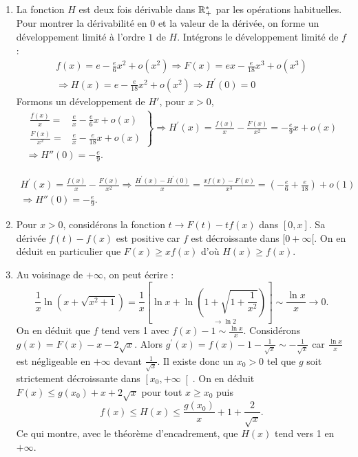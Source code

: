 \begin{enumerate}
\begin{enumerate}
    \item La fonction $H$ est deux fois d{\'e}rivable dans $\mathbb{R}_{+}^{*}$ par les opérations habituelles.\newline 
Pour montrer la dérivabilité en $0$ et la valeur de la dérivée, on forme un développement limité à l'ordre $1$ de $H$. Intégrons le d{\'e}veloppement limit{\'e} de $f$ :
\begin{multline*}
f(x)=e-\frac{e}{6}x^{2}+o(x^{2}) \Rightarrow F(x)=ex-\frac{e}{18}x^{3}+o(x^{3})\\
\Rightarrow H(x) = e -\frac{e}{18}x^{2}+o(x^{2})
\Rightarrow H^{\prime }(0)=0
\end{multline*}
Formons un développement de $H'$, pour $x>0$,
\begin{multline*}
\left. 
\begin{aligned}
  \frac{f(x)}{x} =& \frac{e}{x} - \frac{e}{6}x +o(x) \\
  \frac{F(x)}{x^2} =& \frac{e}{x} - \frac{e}{18}x +o(x)
\end{aligned}
\right\rbrace 
\Rightarrow
 H^{\prime }(x)=\frac{f(x)}{x}-\frac{F(x)}{x^{2}} = -\frac{e}{9}x + o(x) \\
 \Rightarrow H''(0)=-\frac{e}{9}.
\end{multline*}

\begin{multline*}
 H^{\prime }(x)=\frac{f(x)}{x}-\frac{F(x)}{x^{2}} 
 \Rightarrow \frac{H^{\prime }(x)-H^{\prime }(0)}{x}
 =\frac{xf(x)-F(x)}{x^{3}}
 =(-\frac{e}{6}+\frac{e}{18})+o(1) \\
 \Rightarrow H''(0) = -\frac{e}{9}.
\end{multline*}

     \item Pour $x>0$, consid{\'e}rons la fonction $t\rightarrow F(t)-tf(x)$ dans $\left[ 0,x\right]$.\newline
     Sa d{\'e}riv{\'e}e $f(t)-f(x)$ est positive car $f$ est décroissante dans $[0+\infty[$. On en d{\'e}duit en particulier que $F(x)\geq xf(x)$ d'o{\`u} $H(x)\geq f(x)$.

     \item Au voisinage de $+\infty $, on peut {\'e}crire :
\[
\frac{1}{x}\ln \left( x+\sqrt{x^{2}+1}\right) =\frac{1}{x}\left[ \ln x+%
\underset{\longrightarrow \ln 2}{\ln \left( 1+\sqrt{1+\frac{1}{x^{2}}}%
\right) }\right] \sim \frac{\ln x}{x}\rightarrow 0 .
\]
On en d{\'e}duit que $f$ tend vers 1 avec $f(x)-1\sim \frac{\ln x}{x}$.\newline
Consid{\'e}rons $g(x)=F(x)-x-2\sqrt{x}$.\newline
Alors $g^{\prime }(x)=f(x)-1-\frac{1}{\sqrt{x}}\sim -\frac{1}{\sqrt{x}}$ car $\frac{\ln x}{x}$ est négligeable en $+\infty$ devant $\frac{1}{\sqrt{x}}$.\newline
Il existe donc un $x_{0}>0$ tel que $g$ soit strictement d{\'e}croissante dans $\left[x_{0},+\infty \right[ $.\newline
On en d{\'e}duit $F(x)\leq g(x_{0})+x+2\sqrt{x}$ pour tout $x\geq x_{0}$ puis
\[
f(x)\leq H(x)\leq \frac{g(x_{0})}{x}+1+\frac{2}{\sqrt{x}}\text{.}
\]
Ce qui montre, avec le th{\'e}or{\`e}me d'encadrement, que $H(x)$ tend vers 1 en $+\infty $.
  \end{enumerate}


\end{enumerate}
